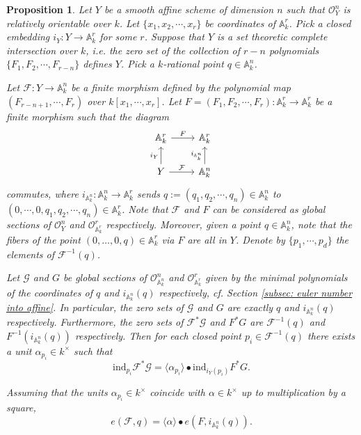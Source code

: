 \documentclass[12pt, reqno]{amsart}
\newtheorem{proposition}[theorem]{Proposition}
\theoremstyle{definition}
\newcommand{\A}{\mathbb{A}} %
\newcommand{\Oh}{\mathscr{O}} %
\newcommand{\ind}{\mathrm{ind}} %
\begin{document}
\begin{proposition} \label{curve_euler_number}
Let $Y$ be a smooth affine scheme of dimension $n$ such that $\Oh^n_Y$ is relatively orientable over $k$. 
Let $\{x_1, x_2, \cdots, x_r\}$ be coordinates of $\A^r_k$. Pick a closed embedding $i_Y: Y \to \A^r_k$ for some $r$. Suppose that $Y$ is a set theoretic complete intersection over $k$, i.e. the zero set of the collection of $r-n$ polynomials $\{F_1, F_2, \cdots, F_{r-n}\}$ defines $Y$. Pick a $k$-rational point $q \in \A^n_k$.

Let $\mathcal{F}: Y \to \A^n_k$ be a finite morphism defined by the polynomial map $(F_{r-n+1}, \cdots, F_r)$ over $k[x_1, \cdots, x_r]$. Let $F = (F_1, F_2, \cdots, F_r): \A^r_k \to \A^r_k$ be a finite morphism such that the diagram
\begin{equation*}
    \begin{tikzcd}
        \A^r_k \arrow[r, "F"] & \A^r_k \\
        Y \arrow[r, "\mathcal{F}"] \arrow[u, "i_Y"] & \A^n_k \arrow[u, "i_{\A^n_k}"]
    \end{tikzcd}
\end{equation*}
commutes, where $i_{\A^n_k}: \A^n_k \to \A^r_k$ sends $q := (q_1, q_2, \cdots, q_n) \in \A^n_k$ to $(0, \cdots, 0, q_1, q_2, \cdots, q_n) \in \A^r_k$. Note that $\mathcal{F}$ and $F$ can be considered as global sections of $\Oh^n_Y$ and $\Oh^r_{\A^r_k}$ respectively. Moreover, given a point $q \in \A^n_k$, note that the fibers of the point $(0,\ldots,0, q) \in \A^r_k$ via $F$ are all in $Y$. Denote by $\{p_1, \cdots, p_d\}$ the elements of $\mathcal{F}^{-1}(q)$. 

Let $\mathcal{G}$ and $G$ be global sections of $\Oh^n_{\A^n_k}$ and $\Oh^r_{\A^r_k}$ given by the minimal polynomials of the coordinates of $q$ and $i_{\A^n_k}(q)$ respectively, cf. Section \ref{subsec: euler number into affine}. In particular, the zero sets of $\mathcal{G}$ and $G$ are exactly $q$ and $i_{\A^n_k}(q)$ respectively. Furthermore, the zero sets of $\mathcal{F}^* \mathcal{G}$ and $F^* G$ are $\mathcal{F}^{-1}(q)$ and $F^{-1}(i_{\A^n_k}(q))$ respectively. Then for each closed point $p_i \in \mathcal{F}^{-1}(q)$ there exists a unit $\alpha_{p_i} \in k^\times$ such that
\begin{equation*}
    \ind_{p_i} \mathcal{F}^* \mathcal{G} = \langle \alpha_{p_i} \rangle \bullet \ind_{i_{Y}(p_i)} F^* G.
\end{equation*}

Assuming that the units $\alpha_{p_i} \in k^\times$ coincide with $\alpha \in k^\times$ up to multiplication by a square,
\begin{equation*}
    e(\mathcal{F}, q) = \langle \alpha \rangle \bullet e(F, i_{\A^n_k}(q)).
\end{equation*}
\end{proposition}
\end{document}
